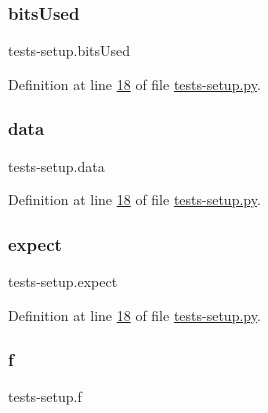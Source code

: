 \subsubsection{\texorpdfstring{bits\+Used}{bitsUsed}}
{\footnotesize\ttfamily tests-\/setup.\+bits\+Used}



Definition at line \mbox{\hyperlink{tests-setup_8py_source_l00018}{18}} of file \mbox{\hyperlink{tests-setup_8py_source}{tests-\/setup.\+py}}.

\mbox{\label{namespacetests-setup_a6b4da66e7d24a18856de9023a2dcede4}} 
\subsubsection{\texorpdfstring{data}{data}}
{\footnotesize\ttfamily tests-\/setup.\+data}



Definition at line \mbox{\hyperlink{tests-setup_8py_source_l00018}{18}} of file \mbox{\hyperlink{tests-setup_8py_source}{tests-\/setup.\+py}}.

\mbox{\label{namespacetests-setup_a2c17344dec99b9aaaddaef4438b1f793}} 
\subsubsection{\texorpdfstring{expect}{expect}}
{\footnotesize\ttfamily tests-\/setup.\+expect}



Definition at line \mbox{\hyperlink{tests-setup_8py_source_l00018}{18}} of file \mbox{\hyperlink{tests-setup_8py_source}{tests-\/setup.\+py}}.

\mbox{\label{namespacetests-setup_a919f85fdaaec93d91baf4a46863c31fd}} 
\subsubsection{\texorpdfstring{f}{f}}
{\footnotesize\ttfamily tests-\/setup.\+f}



